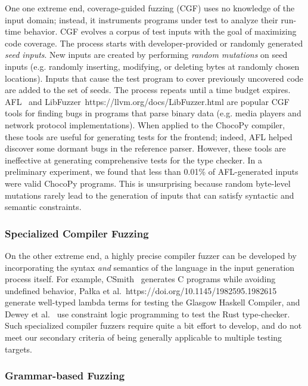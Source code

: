 \documentclass[conference]{IEEEtran}
\begin{document}
One one extreme end, coverage-guided fuzzing (CGF) uses no knowledge of the input domain; instead, it instruments programs under test to analyze their run-time behavior. CGF evolves a corpus of test inputs with the goal of maximizing code coverage. 
The process starts with developer-provided or randomly generated \emph{seed inputs}. New inputs are created by performing \emph{random mutations} on seed inputs (e.g. randomly inserting, modifying, or deleting bytes at randomly chosen locations). Inputs that cause the test program to cover previously uncovered code are added to the set of seeds. The process repeats until a time budget expires.
AFL~\cite{AFL} and LibFuzzer~https://llvm.org/docs/LibFuzzer.html are popular CGF tools for finding bugs in programs that parse binary data (e.g. media players and network protocol implementations). When applied to the ChocoPy compiler, these tools are useful for generating tests for the frontend; indeed, AFL helped discover some dormant bugs in the reference parser. However, these tools are ineffective at generating comprehensive tests for the type checker. In a preliminary experiment, we found that less than 0.01\% of AFL-generated inputs were valid ChocoPy programs. This is unsurprising because random byte-level mutations rarely lead to the generation of inputs that can satisfy syntactic and semantic constraints.

\subsubsection{Specialized Compiler Fuzzing}

On the other extreme end, a highly precise compiler fuzzer can be developed by incorporating the syntax \emph{and} semantics of the language in the input generation process itself. For example, CSmith~\cite{Yang11} generates C programs while avoiding undefined behavior, Pa\l{}ka et al.~https://doi.org/10.1145/1982595.1982615 generate well-typed lambda terms for testing the Glasgow Haskell Compiler, and Dewey et al.~\cite{Dewey15} use constraint logic programming to test the Rust type-checker. Such specialized compiler fuzzers require quite a bit effort to develop, and do not meet our secondary criteria of being generally applicable to multiple testing targets.

\subsubsection{Grammar-based Fuzzing}
\end{document}
